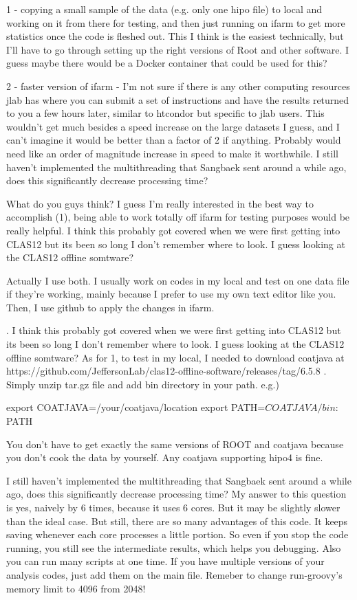     1 - copying a small sample of the data (e.g. only one hipo file) to local and working on it from there for testing, and then just running on ifarm to get more statistics once the code is fleshed out. This I think is the easiest technically, but I'll have to go through setting up the right versions of Root and other software. I guess maybe there would be a Docker container that could be used for this?
    
    2 - faster version of ifarm - I'm not sure if there is any other computing resources jlab has where you can submit a set of instructions and have the results returned to you a few hours later, similar to htcondor but specific to jlab users. This wouldn't get much besides a speed increase on the large datasets I guess, and I can't imagine it would be better than a factor of 2 if anything. Probably would need like an order of magnitude increase in speed to make it worthwhile. I still haven't implemented the multithreading that Sangbaek sent around a while ago, does this significantly decrease processing time?
    
    
    What do you guys think? I guess I'm really interested in the best way to accomplish (1), being able to work totally off ifarm for testing purposes would be really helpful. I think this probably got covered when we were first getting into CLAS12 but its been so long I don't remember where to look. I guess looking at the CLAS12 offline somtware?

    Actually I use both. I usually work on codes in my local and test on one data file if they're working, mainly because I prefer to use my own text editor like you. Then, I use github to apply the changes in ifarm.
    
    . I think this probably got covered when we were first getting into CLAS12 but its been so long I don't remember where to look. I guess looking at the CLAS12 offline somtware?
    As for 1, to test in my local, I needed to download coatjava at https://github.com/JeffersonLab/clas12-offline-software/releases/tag/6.5.8 . Simply unzip tar.gz file and add bin directory in your path. e.g.)
    
    export COATJAVA=/your/coatjava/location
    export PATH=$COATJAVA/bin:$PATH
    
    You don't have to get exactly the same versions of ROOT and coatjava because you don't cook the data by yourself. Any coatjava supporting hipo4 is fine.
    
     I still haven't implemented the multithreading that Sangbaek sent around a while ago, does this significantly decrease processing time?
    My answer to this question is yes, naively by 6 times, because it uses 6 cores. But it may be slightly slower than the ideal case. But still, there are so many advantages of this code. It keeps saving whenever each core processes a little portion. So even if you stop the code running, you still see the intermediate results, which helps you debugging. Also you can run many scripts at one time. If you have multiple versions of your analysis codes, just add them on the main file. Remeber to change run-groovy's memory limit to 4096 from 2048!
    
